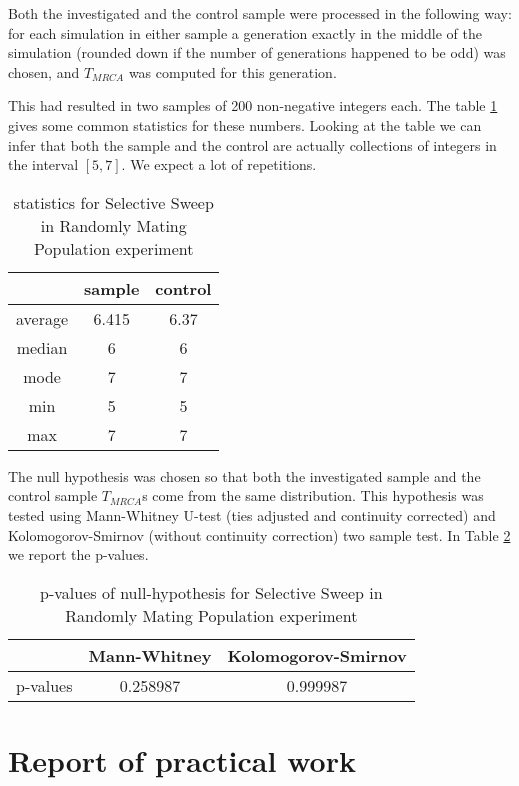 \documentclass{l4proj}
\newif\ifdebug
\begin{document}
Both the investigated and the control sample were processed in the following way: for each simulation in either sample a generation exactly in the middle of the simulation (rounded down if the number of generations happened to be odd) was chosen, and $T_{MRCA}$ was computed for this generation.

This had resulted in two samples of 200 non-negative integers each. The table \ref{populationTable} gives some common statistics for these numbers. Looking at the table we can infer that both the sample and the control are actually collections of integers in the interval $[5, 7]$. We expect a lot of repetitions.

\begin{table}[]
    \centering
    \begin{tabular}{|c|c|c|}
    \hline
     & sample & control \\ \hline\hline
     average & 6.415 & 6.37 \\ \hline
     median & 6 & 6 \\ \hline
     mode & 7 & 7 \\ \hline
     min & 5 & 5 \\ \hline
     max & 7 & 7 \\ \hline
    \end{tabular}
    \caption{statistics for Selective Sweep in Randomly Mating Population experiment}
    \label{populationTable}
\end{table}

The null hypothesis was chosen so that both the investigated sample and the control sample $T_{MRCA}$s come from the same distribution. This hypothesis was tested using Mann-Whitney U-test (ties adjusted and continuity corrected) and Kolomogorov-Smirnov (without continuity correction) two sample test. In Table \ref{nullHypothesisTable} we report the p-values.

\begin{table}[]
    \centering
    \begin{tabular}{|c|c|c|}
    \hline
    & Mann-Whitney & Kolomogorov-Smirnov \\ \hline
    p-values & 0.258987 & 0.999987 \\ \hline
    \end{tabular}
    \caption{p-values of null-hypothesis for Selective Sweep in Randomly Mating Population experiment}
    \label{nullHypothesisTable}
\end{table}


\chapter{Report of practical work}\label{practical}
\ifdebug
This section should summarize the practical work done and its results, concentrating on any unusual or original features. Enough detail should be included to assure the reader that the work has been professionally and competently done, and that the results are trustworthy. Any design features, algorithms and data structures of special interest should be described. Documentation to full software engineering standards is not required.
\fi
\end{document}
